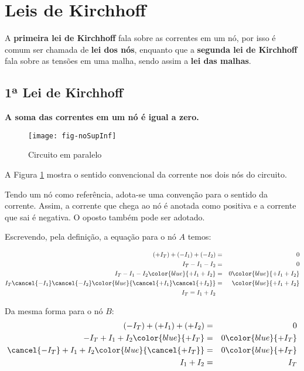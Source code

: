 \section{Leis de Kirchhoff}

A \textbf{primeira lei de Kirchhoff} fala sobre as correntes em um nó, por isso é comum ser chamada de \textbf{lei dos nós}, enquanto que a \textbf{segunda lei de Kirchhoff} fala sobre as tensões em uma malha, sendo assim a \textbf{lei das malhas}.


\subsection{1ª Lei de Kirchhoff}

\textbf{A soma das correntes em um nó é igual a zero.}

\begin{figure}[!h]
	\centering
	\caption{Circuito em paralelo}
	\texttt{[image: fig-noSupInf]}
	\label{fig:nosAeB}
\end{figure}


A Figura \ref{fig:nosAeB} mostra o sentido convencional da corrente nos dois nós do circuito.

Tendo um nó como referência, adota-se uma convenção para o sentido da corrente. Assim, a corrente que chega ao nó é anotada como positiva e a corrente que sai é negativa. O oposto também pode ser adotado.

Escrevendo, pela definição, a equação para o nó $A$ temos:

\begin{eqnarray}
\label{eq:1kirchhoff}
(+I_T) + (-I_1) + (-I_2) & = & 0\\
I_T - I_1 - I_2 & = & 0 \nonumber\\
I_T - I_1 - I_2 \color{blue}{+ I_1 + I_2}& = & 0 \color{blue}{+I_1 + I_2} \nonumber\\
I_T \cancel{-I_1} \cancel{- I_2} \color{blue}{\cancel{+ I_1} \cancel{+ I_2}}& = & \color{blue}{+I_1 + I_2} \nonumber\\
I_T = I_1 + I_2
\end{eqnarray}

Da mesma forma para o nó $B$:
\begin{eqnarray}
(-I_T) + (+I_1) + (+I_2) & = & 0 \nonumber\\
-I_T + I_1 + I_2 \color{blue}{+I_T}& = & 0\color{blue}{+I_T} \nonumber\\
\cancel{-I_T} + I_1 + I_2 \color{blue}{\cancel{+I_T}}& = & 0\color{blue}{+I_T} \nonumber\\
I_1 + I_2 & = & I_T \nonumber
\end{eqnarray}










